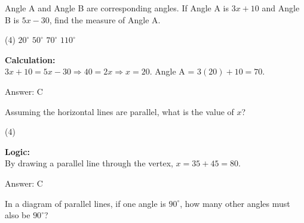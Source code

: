 \documentclass[11pt,paper=a4,answers]{exam}
\begin{document}
\begin{questions}
\vspace{60pt}

\question
Angle A and Angle B are corresponding angles. If Angle A is $3x + 10$ and Angle B is $5x - 30$, find the measure of Angle A.
\begin{tasks}(4)
    \task $20^\circ$
    \task $50^\circ$
    \task $70^\circ$
    \task $110^\circ$
\end{tasks}

\begin{solution}
\textbf{Calculation:} \\
$3x + 10 = 5x - 30 \Rightarrow 40 = 2x \Rightarrow x = 20$.
Angle A = $3(20) + 10 = 70$.

\vspace{30pt}

Answer: \colorbox{yellow!100}{C}
\end{solution}

\vspace{60pt}

\question
\begin{center}
\end{center}
Assuming the horizontal lines are parallel, what is the value of $x$?
\begin{tasks}(4)
\end{tasks}

\begin{solution}
\textbf{Logic:} \\
By drawing a parallel line through the vertex, $x = 35 + 45 = 80$.

\vspace{30pt}

Answer: \colorbox{yellow!100}{C}
\end{solution}

\vspace{60pt}

\question
In a diagram of parallel lines, if one angle is $90^\circ$, how many other angles must also be $90^\circ$?


\end{questions}
\end{document}
